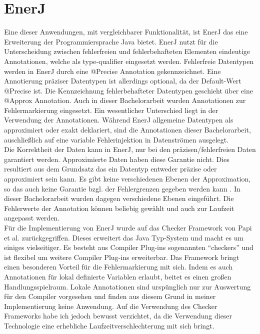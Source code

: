 \section{EnerJ}
Eine dieser Anwendungen, mit vergleichbarer Funktionalit\"at, ist EnerJ das eine Erweiterung der Programmiersprache Java bietet. EnerJ nutzt f\"ur die Unterscheidung zwischen fehlerfreien und fehlerbehafteten Elementen eindeutige Annotationen, welche als type-qualifier eingesetzt werden. Fehlerfreie Datentypen werden in EnerJ durch eine @Precise Annotation gekennzeichnet. Eine Annotierung präziser Datentypen ist allerdings optional, da der Default-Wert @Precise ist. Die Kennzeichnung fehlerbehafteter  Datentypen geschieht über eine @Approx Annotation. Auch in dieser Bachelorarbeit wurden Annotationen zur Fehlermarkierung eingesetzt. Ein wesentlicher Unterschied liegt in der Verwendung der Annotationen. Während EnerJ allgemeine Datentypen als approximiert oder exakt deklariert, sind die Annotationen dieser Bachelorarbeit, auschlie\ss lich auf eine variable Fehlerinjektion in Datenströmen ausgelegt.  \\
Die Korrektheit der Daten kann in EnerJ, nur bei den pr\"azisen/fehlerfreien Daten garantiert werden. Approximierte Daten haben diese Garantie nicht. Dies resultiert aus dem Grundsatz das ein Datentyp entweder pr\"azise oder approximiert sein kann. Es gibt keine verschiedenen Ebenen der Approximation, so das auch keine Garantie bzgl. der Fehlergrenzen gegeben werden kann \cite{EnerJ11}. In dieser Bachelorarbeit wurden dagegen verschiedene Ebenen eingef\"uhrt. Die Fehlerwerte der  Annotation k\"onnen beliebig gewählt und auch zur Laufzeit angepasst werden. \\
F\"ur die Implementierung von EnerJ wurde auf das Checker Framework von Papi et al. \cite{checkerframework} zur\"uckgegriffen. Dieses erweitert das Java Typ-System und macht es um einiges vielseitiger. Es besteht aus Compiler Plug-ins sogenannten ``checkers'' und ist flexibel um weitere Compiler Plug-ins erweiterbar. Das Framework bringt einen besonderen Vorteil f\"ur die Fehlermarkierung mit sich. Indem es auch Annotationen für lokal definierte Variablen erlaubt, beitet es einen großen Handlungsspielraum. Lokale Annotationen sind ursp\"unglich nur zur Auswertung f\"ur den Compiler vorgesehen und finden aus diesem Grund in meiner Implementierung keine Anwendung. Auf die Verwendung des Checker Frameworks habe ich jedoch bewusst verzichtet, da die Verwendung dieser Technologie eine erhebliche Laufzeitverschlechterung mit sich bringt.

